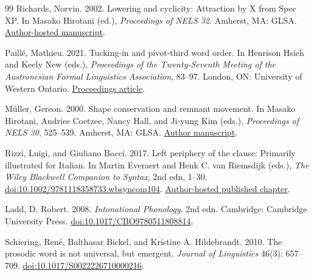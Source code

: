 \begin{thebibliography}{99}
Richards, Norvin. 2002.
Lowering and cyclicity: Attraction by X from Spec XP.
In Masako Hirotani (ed.), \textit{Proceedings of NELS 32}.
Amherst, MA: GLSA.
\href{https://web.mit.edu/norvin/www/24.956/Richards.pdf}{Author-hosted manuscript}.

Paill\'{e}, Mathieu. 2021.
Tucking-in and pivot-third word order.
In Henrison Hsieh and Keely New (eds.),
\textit{Proceedings of the Twenty-Seventh Meeting of the Austronesian
Formal Linguistics Association}, 83--97.
London, ON: University of Western Ontario.
\href{https://ojs.lib.uwo.ca/index.php/afla/article/download/23495/17996/63164}{Proceedings article}.

M\"uller, Gereon. 2000.
Shape conservation and remnant movement.
In Masako Hirotani, Andries Coetzee, Nancy Hall, and Ji-yung Kim (eds.),
\textit{Proceedings of NELS 30}, 525--539.
Amherst, MA: GLSA.
\href{https://roa.rutgers.edu/files/365-1299/roa-365-mueller-2.pdf}{Author manuscript}.

Rizzi, Luigi, and Giuliano Bocci. 2017.
Left periphery of the clause: Primarily illustrated for Italian.
In Martin Everaert and Henk C. van Riemsdijk (eds.),
\textit{The Wiley Blackwell Companion to Syntax}, 2nd edn, 1--30.
\href{https://doi.org/10.1002/9781118358733.wbsyncom104}{doi:10.1002/9781118358733.wbsyncom104}.
\href{https://www.unige.ch/lettres/linguistique/application/files/1115/3736/0647/Rizzi_Bocci_2017_Left_Periphery.pdf}{Author-hosted published chapter}.

Ladd, D. Robert. 2008.
\textit{Intonational Phonology}. 2nd edn.
Cambridge: Cambridge University Press.
\href{https://doi.org/10.1017/CBO9780511808814}{doi:10.1017/CBO9780511808814}.

Schiering, Ren\'{e}, Balthasar Bickel, and Kristine A. Hildebrandt. 2010.
The prosodic word is not universal, but emergent.
\textit{Journal of Linguistics} 46(3): 657--709.
\href{https://doi.org/10.1017/S0022226710000216}{doi:10.1017/S0022226710000216}.




\end{thebibliography}
\endgroup
